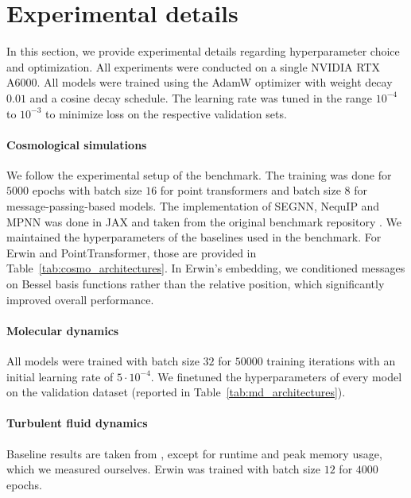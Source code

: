 \section{Experimental details}
\label{appendix:experimental_detail}

In this section, we provide experimental details regarding hyperparameter choice and optimization. All experiments were conducted on a single NVIDIA RTX A6000. All models were trained using the AdamW optimizer \cite{Loshchilov2017DecoupledWD} with weight decay $0.01$ and a cosine decay schedule. The learning rate was tuned in the range $10^{-4}$ to $10^{-3}$ to minimize loss on the respective validation sets.

\vspace{-5pt}
\paragraph{Cosmological simulations}
We follow the experimental setup of the benchmark. The training was done for $5000$ epochs with batch size $16$ for point transformers and batch size $8$ for message-passing-based models. The implementation of SEGNN, NequIP and MPNN was done in JAX and taken from the original benchmark repository \cite{Balla2024ACB}. We maintained the hyperparameters of the baselines used in the benchmark. For Erwin and PointTransformer, those are provided in Table~\ref{tab:cosmo_architectures}. In Erwin's embedding, we conditioned messages on Bessel basis functions rather than the relative position, which significantly improved overall performance.

\vspace{-5pt}
\paragraph{Molecular dynamics}
All models were trained with batch size $32$ for $50000$ training iterations with an initial learning rate of $5 \cdot 10^{-4}$. We finetuned the hyperparameters of every model on the validation dataset (reported in Table~\ref{tab:md_architectures}).

\vspace{-5pt}
\paragraph{Turbulent fluid dynamics}
Baseline results are taken from \cite{Janny2023EagleLL}, except for runtime and peak memory usage, which we measured ourselves. Erwin was trained with batch size $12$ for $4000$ epochs. 

